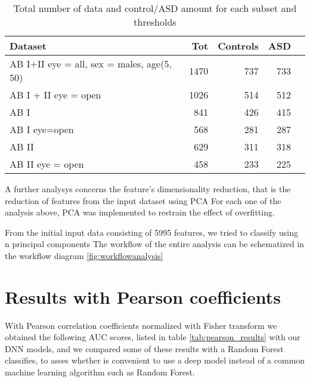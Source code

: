 \documentclass[12pt]{report}
\begin{document}
\begin{table}[!htp]\centering
\scriptsize
\begin{tabular}{lrrrr}\toprule
Dataset &Tot &Controls &ASD \\\midrule
AB I+II eye = all, sex = males, age(5, 50) &1470 &737 &733 \\
AB I + II eye = open &1026 &514 &512 \\
AB I &841 &426 &415 \\
AB I eye=open &568 &281 &287 \\
AB II &629 &311 &318 \\
AB II eye = open &458 &233 &225 \\
\bottomrule
\end{tabular}
\caption{Total number of data and control/ASD amount for each subset and thresholds}
\label{tab:controlasd_per_subset}
\end{table}


A further analysys concerns the feature's dimensionality reduction, that is the reduction of features from the input dataset using PCA
For each one of the analysis above, PCA was implemented to restrain the effect of overfitting.

From the initial input data consisting of 5995 features, we tried to classify using n principal components
The workflow of the entire analysis can be schematized in the workflow diagram \ref{fig:workflowanalysis}



\newpage
\section{Results with Pearson coefficients}

With Pearson correlation coefficients normalized with Fisher transform we obtained the following AUC scores, listed in table \ref{tab:pearson_results} with our DNN models, and we compared some of these results with a Random Forest classifies, to asses whether is convenient to use a deep model instead of a common machine learning algorithm such as Random Forest.
\end{document}
